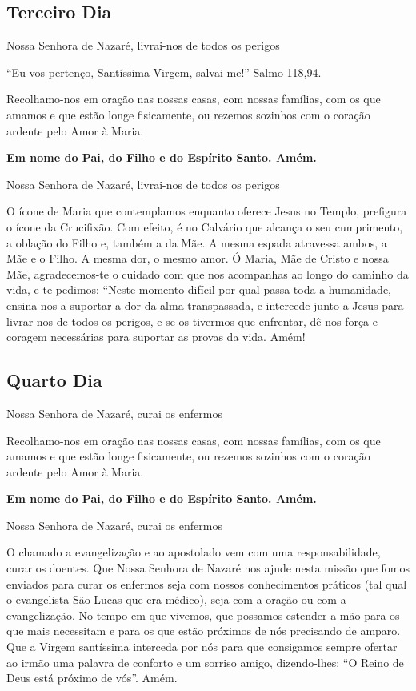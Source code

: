 \documentclass[a4paper,14pt]{extarticle} \usepackage[utf8]{inputenc}
\begin{document}
\textbf{}

\subsection{Terceiro Dia}

\textbf{}

Nossa Senhora de Nazaré, livrai-nos de todos os perigos

“Eu vos pertenço, Santíssima Virgem, salvai-me!” Salmo 118,94.

Recolhamo-nos em oração nas nossas casas, com nossas famílias, com os que amamos e que estão longe fisicamente, ou rezemos sozinhos com o coração ardente pelo Amor à Maria.

\textbf{Em nome do Pai, do Filho e do Espírito Santo. Amém.}

Nossa Senhora de Nazaré, livrai-nos de todos os perigos

O ícone de Maria que contemplamos enquanto oferece Jesus no Templo, prefigura o ícone da Crucifixão. Com efeito, é no Calvário que alcança o seu cumprimento, a oblação do Filho e, também a da Mãe. A mesma espada atravessa ambos, a Mãe e o Filho. A mesma dor, o mesmo amor. Ó Maria, Mãe de Cristo e nossa Mãe, agradecemos-te o cuidado com que nos acompanhas ao longo do caminho da vida, e te pedimos: “Neste momento difícil por qual passa toda a humanidade, ensina-nos a suportar a dor da alma transpassada, e intercede junto a Jesus para livrar-nos de todos os perigos, e se os tivermos que enfrentar, dê-nos força e coragem necessárias para suportar as provas da vida. Amém!

\textbf{}

\subsection{Quarto Dia}

\textbf{}

Nossa Senhora de Nazaré, curai os enfermos

Recolhamo-nos em oração nas nossas casas, com nossas famílias, com os que amamos e que estão longe fisicamente, ou rezemos sozinhos com o coração ardente pelo Amor à Maria.

\textbf{Em nome do Pai, do Filho e do Espírito Santo. Amém.}

Nossa Senhora de Nazaré, curai os enfermos

O chamado a evangelização e ao apostolado vem com uma responsabilidade, curar os doentes. Que Nossa Senhora de Nazaré nos ajude nesta missão que fomos enviados para curar os enfermos seja com nossos conhecimentos práticos (tal qual o evangelista São Lucas que era médico), seja com a oração ou com a evangelização. No tempo em que vivemos, que possamos estender a mão para os que mais necessitam e para os que estão próximos de nós precisando de amparo. Que a Virgem santíssima interceda por nós para que consigamos sempre ofertar ao irmão uma palavra de conforto e um sorriso amigo, dizendo-lhes: “O Reino de Deus está próximo de vós”. Amém.
\end{document}
